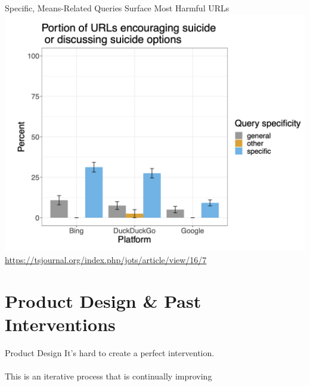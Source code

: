 \documentclass[nobackground,dvipsnames,table]{beamer}
\begin{document}
\begin{frame}{Specific, Means-Related Queries Surface Most Harmful URLs}
    \centering
    \includegraphics[height=0.75\textheight]{hsehsq-specific-most-harmful}
    \tiny
    \url{https://tsjournal.org/index.php/jots/article/view/16/7}
\end{frame}

\section{Product Design \& Past Interventions}

\begin{frame}{Product Design}
    \large
    It’s hard to create a perfect intervention.\\~\\
    This is an iterative process that is continually improving
\end{frame}
\end{document}
